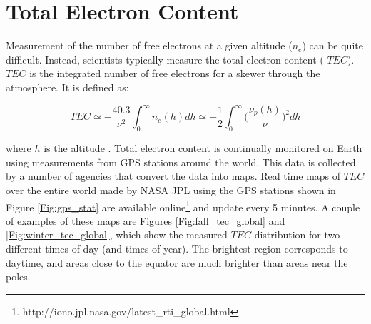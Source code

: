 \section{Total Electron Content}
Measurement of the number of free electrons at a given altitude ($n_e$) can be quite difficult. Instead, scientists typically measure the total electron content (
$TEC$). $TEC$ is the integrated number of free electrons for a skewer through the atmosphere. It is defined as:

\begin{equation}
TEC \simeq -\frac{40.3}{\nu^2} \int_0^\infty n_e (h) dh \simeq -\frac{1}{2} \int_0^\infty  \Big( \frac{\nu_p (h)}{\nu} \Big)^2 dh
\end{equation}

where $h$ is the altitude \cite{thompson_2001}. Total electron content is continually monitored on Earth using measurements from GPS stations around the world. This data is collected by a number of agencies that convert the data into maps. Real time maps of $TEC$ over the entire world made by NASA JPL using the GPS stations shown in Figure \ref{Fig:gps_stat} are available online\footnote{http://iono.jpl.nasa.gov/latest_rti_global.html} and update every 5 minutes. A couple of examples of these maps are Figures \ref{Fig:fall_tec_global} and \ref{Fig:winter_tec_global}, which show the measured $TEC$ distribution for two different times of day (and times of year). The brightest region corresponds to daytime, and areas close to the equator are much brighter than areas near the poles.


